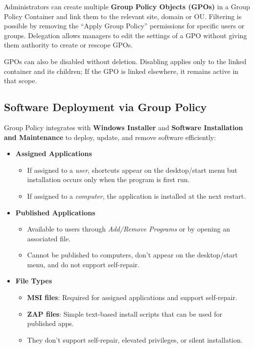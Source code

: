 Administrators can create multiple \textbf{Group Policy Objects (GPOs)} in a Group Policy Container and link them to the relevant site, domain or OU. Filtering is possible by removing the “Apply Group Policy” permissions for specific users or groups. Delegation allows managers to edit the settings of a GPO without giving them authority to create or rescope GPOs.

GPOs can also be disabled without deletion. Disabling applies only to the linked container and its children; If the GPO is linked elsewhere, it remains active in that scope.

\subsection{Software Deployment via Group Policy}
Group Policy integrates with \textbf{Windows Installer} and \textbf{Software Installation and Maintenance} to deploy, update, and remove software efficiently:

\begin{itemize}
    \item \textbf{Assigned Applications}
    \begin{itemize}
        \item If assigned to a \textit{user}, shortcuts appear on the desktop/start menu but installation occurs only when the program is first run.
        \item If assigned to a \textit{computer}, the application is installed at the next restart.
    \end{itemize}
    \item \textbf{Published Applications}
    \begin{itemize}
        \item Available to users through \textit{Add/Remove Programs} or by opening an associated file.
        \item Cannot be published to computers, don’t appear on the desktop/start menu, and do not support self-repair.
    \end{itemize}
    \item \textbf{File Types}
    \begin{itemize}
        \item \textbf{MSI files}: Required for assigned applications and support self-repair.
        \item \textbf{ZAP files}: Simple text-based install scripts that can be used for published apps.        
        \item They don’t support self-repair, elevated privileges, or silent installation.
    \end{itemize}
\end{itemize}

